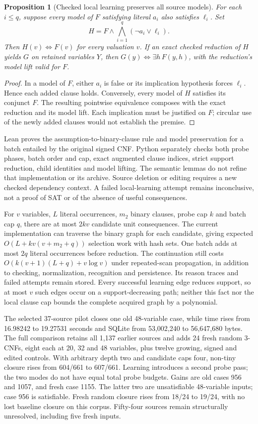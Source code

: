 \documentclass[11pt,a4paper]{article}
\numberwithin{equation}{section}
\theoremstyle{plain}
\newtheorem{proposition}[lemma]{Proposition}
\theoremstyle{definition}
\theoremstyle{remark}
\begin{document}
\begin{proposition}[Checked local learning preserves all source models]
\label{prop:probe-learning}
For each $i\leq q$, suppose every model of $F$ satisfying literal $a_i$ also satisfies $\ell_i$. Set
\[
H=F\wedge\bigwedge_{i=1}^{q}(\neg a_i\vee\ell_i).
\]
Then $H(v)\Longleftrightarrow F(v)$ for every valuation $v$. If an exact checked reduction of $H$ yields $G$ on retained variables $Y$, then $G(y)\Longleftrightarrow\exists h\,F(y,h)$, with the reduction's model lift valid for $F$.
\end{proposition}
\begin{proof}
In a model of $F$, either $a_i$ is false or its implication hypothesis forces $\ell_i$. Hence each added clause holds. Conversely, every model of $H$ satisfies its conjunct $F$. The resulting pointwise equivalence composes with the exact reduction and its model lift. Each implication must be justified on $F$; circular use of the newly added clauses would not establish the premise.
\end{proof}

Lean proves the assumption-to-binary-clause rule and model preservation for a batch entailed by the original signed CNF. Python separately checks both probe phases, batch order and cap, exact augmented clause indices, strict support reduction, child identities and model lifting. The semantic lemmas do not refine that implementation or its archive. Source deletion or editing requires a new checked dependency context. A failed local-learning attempt remains inconclusive, not a proof of SAT or of the absence of useful consequences.

For $v$ variables, $L$ literal occurrences, $m_2$ binary clauses, probe cap $k$ and batch cap $q$, there are at most $2kv$ candidate unit consequences. The current implementation can traverse the binary graph for each candidate, giving expected $O(L+kv(v+m_2+q))$ selection work with hash sets. One batch adds at most $2q$ literal occurrences before reduction. The continuation still costs $O(k(v+1)(L+q)+v\log v)$ under repeated-scan propagation, in addition to checking, normalization, recognition and persistence. Its reason traces and failed attempts remain stored. Every successful learning edge reduces support, so at most $v$ such edges occur on a support-decreasing path; neither this fact nor the local clause cap bounds the complete acquired graph by a polynomial.

The selected 37-source pilot closes one old 48-variable case, while time rises from 16.98242 to 19.27531 seconds and SQLite from 53,002,240 to 56,647,680 bytes. The full comparison retains all 1,137 earlier sources and adds 24 fresh random 3-CNFs, eight each at 20, 32 and 48 variables, plus twelve growing, signed and edited controls. With arbitrary depth two and candidate caps four, non-tiny closure rises from 604/661 to 607/661. Learning introduces a second probe pass; the two modes do not have equal total probe budgets. Gains are old cases 956 and 1057, and fresh case 1155. The latter two are unsatisfiable 48-variable inputs; case 956 is satisfiable. Fresh random closure rises from 18/24 to 19/24, with no lost baseline closure on this corpus. Fifty-four sources remain structurally unresolved, including five fresh inputs.
\end{document}
